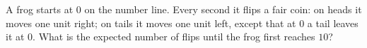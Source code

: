 A frog starts at $0$ on the number line. Every second it flips a fair coin: on heads it moves one unit right; on tails it moves one unit left, except that at $0$ a tail leaves it at $0$. What is the expected number of flips until the frog first reaches $10$?
